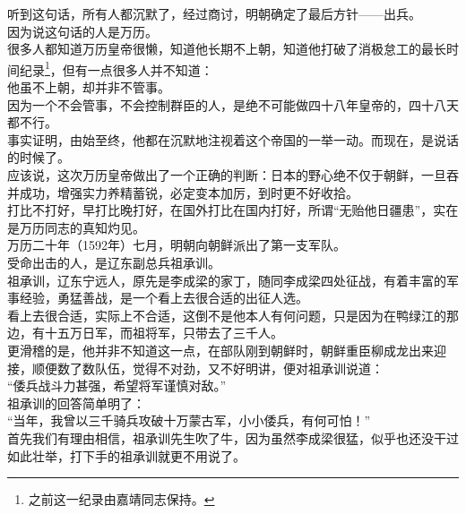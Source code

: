 \begin{multicols}{\theparacolNo}
听到这句话，所有人都沉默了，经过商讨，明朝确定了最后方针——出兵。\\

因为说这句话的人是万历。\\

很多人都知道万历皇帝很懒，知道他长期不上朝，知道他打破了消极怠工的最长时间纪录\footnote{之前这一纪录由嘉靖同志保持。}，但有一点很多人并不知道：\\

他虽不上朝，却并非不管事。\\

因为一个不会管事，不会控制群臣的人，是绝不可能做四十八年皇帝的，四十八天都不行。\\

事实证明，由始至终，他都在沉默地注视着这个帝国的一举一动。而现在，是说话的时候了。\\

应该说，这次万历皇帝做出了一个正确的判断：日本的野心绝不仅于朝鲜，一旦吞并成功，增强实力养精蓄锐，必定变本加厉，到时更不好收拾。\\

打比不打好，早打比晚打好，在国外打比在国内打好，所谓“无贻他日疆患”，实在是万历同志的真知灼见。\\

万历二十年（1592年）七月，明朝向朝鲜派出了第一支军队。\\

受命出击的人，是辽东副总兵祖承训。\\

祖承训，辽东宁远人，原先是李成梁的家丁，随同李成梁四处征战，有着丰富的军事经验，勇猛善战，是一个看上去很合适的出征人选。\\

看上去很合适，实际上不合适，这倒不是他本人有何问题，只是因为在鸭绿江的那边，有十五万日军，而祖将军，只带去了三千人。\\

更滑稽的是，他并非不知道这一点，在部队刚到朝鲜时，朝鲜重臣柳成龙出来迎接，顺便数了数队伍，觉得不对劲，又不好明讲，便对祖承训说道：\\

“倭兵战斗力甚强，希望将军谨慎对敌。”\\

祖承训的回答简单明了：\\

“当年，我曾以三千骑兵攻破十万蒙古军，小小倭兵，有何可怕！”\\

首先我们有理由相信，祖承训先生吹了牛，因为虽然李成梁很猛，似乎也还没干过如此壮举，打下手的祖承训就更不用说了。\\


\end{multicols}
